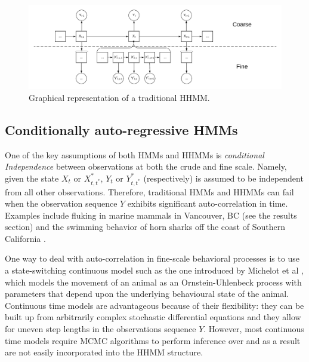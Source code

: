 \begin{figure}[h!]
	\centering
	\includegraphics[width=6.5in]{../Plots/HHMM.png}
	\caption{Graphical representation of a traditional HHMM.}
	\label{fig:HHMM}
\end{figure}


\subsection{Conditionally auto-regressive HMMs}

One of the key assumptions of both HMMs and HHMMs is \textit{conditional Independence} between observations at both the crude and fine scale. Namely, given the state $X_t$ or $X^*_{t,t^*}$, $Y_t$ or $Y^*_{t,t^*}$ (respectively) is assumed to be independent from all other observations. Therefore, traditional HMMs and HHMMs can fail when the observation sequence $Y$ exhibits significant auto-correlation in time. Examples include fluking in marine mammals in Vancouver, BC (see the results section) and the swimming behavior of horn sharks off the coast of Southern California \cite{Adam:2019}.

One way to deal with auto-correlation in fine-scale behavioral processes is to use a state-switching continuous model such as the one introduced by Michelot et al \cite{Michelot:2019}, which models the movement of an animal as an Ornstein-Uhlenbeck process with parameters that depend upon the underlying behavioural state of the animal. Continuous time models are advantageous because of their flexibility: they can be built up from arbitrarily complex stochastic differential equations and they allow for uneven step lengths in the observations sequence $Y$. However, most continuous time models require MCMC algorithms to perform inference over and as a result are not easily incorporated into the HHMM structure.

